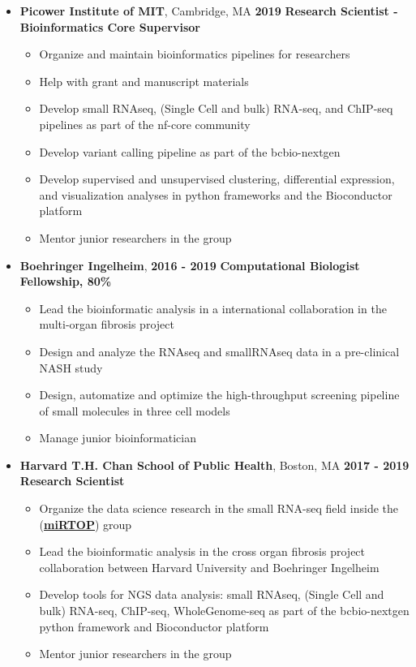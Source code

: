 \begin{itemize}
\item
\textbf{Picower Institute of MIT}, Cambridge, MA \hfill \textbf{2019}
\newline
\textbf{Research Scientist - Bioinformatics Core Supervisor}
 \begin{itemize}
\item
  Organize and maintain bioinformatics pipelines for researchers
\item
  Help with grant and manuscript materials
\item 
  Develop small RNAseq, (Single Cell and bulk) RNA-seq, and ChIP-seq pipelines
  as part of the nf-core community
\item
  Develop variant calling pipeline as part of the bcbio-nextgen
\item 
  Develop supervised and unsupervised clustering, differential expression, and visualization analyses
  in python frameworks and the Bioconductor platform
\item Mentor junior researchers in the group
 \end{itemize}

\item
  \textbf{Boehringer Ingelheim}, \hfill \textbf{2016 - 2019}
  \newline
  \textbf{Computational Biologist Fellowship, 80\%}
 \begin{itemize}
  \item Lead the bioinformatic analysis in a international collaboration in the multi-organ fibrosis project
  \item Design and analyze the RNAseq and smallRNAseq data in a pre-clinical NASH study
  \item Design, automatize and optimize the high-throughput screening pipeline of small molecules in three cell models
  \item Manage junior bioinformatician
\end{itemize}

\item
  \textbf{Harvard T.H. Chan School of Public Health}, Boston, MA \hfill \textbf{2017 - 2019}
  \newline
  \textbf{Research Scientist}
 \begin{itemize}
  \item
    Organize the data science research in the small RNA-seq field inside the  (\href{https://mirtop.github.com}{\textbf{miRTOP}}) group
  \item
    Lead the bioinformatic analysis in the cross organ fibrosis project
    collaboration between Harvard University and Boehringer Ingelheim
  \item
    Develop tools for NGS data analysis: small RNAseq, (Single
    Cell and bulk) RNA-seq, ChIP-seq, WholeGenome-seq as part of the bcbio-nextgen
    python framework and Bioconductor platform
  \item Mentor junior researchers in the group
\end{itemize}


\end{itemize}
